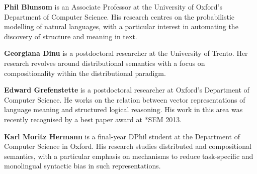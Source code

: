 \begin{bio}
{\bfseries Phil Blunsom} is an Associate Professor at the University of Oxford's Department of Computer Science. His research centres on the probabilistic modelling of natural languages, with a particular interest in automating the discovery of structure and meaning in text.

{\bfseries Georgiana Dinu} is a postdoctoral researcher at the University of Trento. Her research revolves around distributional semantics with a focus on compositionality within the distributional paradigm.

{\bfseries Edward Grefenstette} is a postdoctoral researcher at Oxford's Department of Computer Science. He works on the relation between vector representations of language meaning and structured logical reasoning. His work in this area was recently recognised by a best paper award at *SEM 2013.

{\bfseries Karl Moritz Hermann} is a final-year DPhil student at the Department of Computer Science in Oxford. His research studies distributed and compositional semantics, with a particular emphasis on mechanisms to reduce task-specific and monolingual syntactic bias in such representations.
\end{bio}

